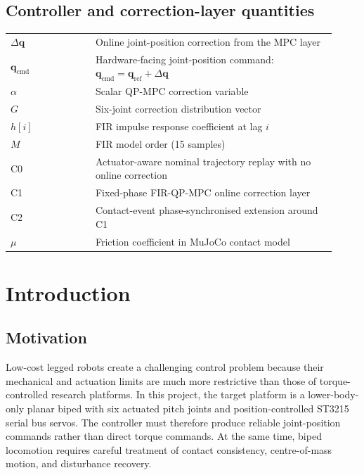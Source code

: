 \documentclass[12pt,a4paper]{report}
\begin{document}
\section*{Controller and correction-layer quantities}
\begin{tabular}{@{}>{\raggedright\arraybackslash}p{0.24\linewidth}>{\raggedright\arraybackslash}p{0.68\linewidth}@{}}
$\Delta\mathbf{q}$ & Online joint-position correction from the MPC layer \\
$\mathbf{q}_{\mathrm{cmd}}$ & Hardware-facing joint-position command: $\mathbf{q}_{\mathrm{cmd}}=\mathbf{q}_{\mathrm{ref}}+\Delta\mathbf{q}$ \\
$\alpha$ & Scalar QP-MPC correction variable \\
$G$ & Six-joint correction distribution vector \\
$h[i]$ & FIR impulse response coefficient at lag $i$ \\
$M$ & FIR model order (15 samples) \\
C0 & Actuator-aware nominal trajectory replay with no online correction \\
C1 & Fixed-phase FIR-QP-MPC online correction layer \\
C2 & Contact-event phase-synchronised extension around C1 \\
$\mu$ & Friction coefficient in MuJoCo contact model \\
\end{tabular}
 
\clearpage
 
 
\chapter{Introduction}
 
\section{Motivation}
Low-cost legged robots create a challenging control problem because their mechanical and actuation limits are much more restrictive than those of torque-controlled research platforms. In this project, the target platform is a lower-body-only planar biped with six actuated pitch joints and position-controlled ST3215 serial bus servos. The controller must therefore produce reliable joint-position commands rather than direct torque commands. At the same time, biped locomotion requires careful treatment of contact consistency, centre-of-mass motion, and disturbance recovery.
 
\end{document}
